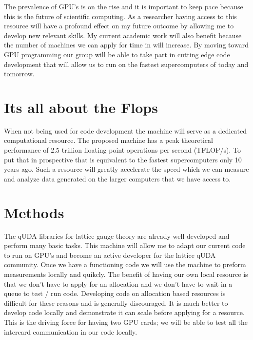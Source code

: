 \documentclass[11pt]{article}
\begin{document}
  The prevalence of GPU's is on the rise and it is important to keep pace because this is the future of scientific computing.
  As a researcher having access to this resource will have a profound effect on my future outcome by allowing me to develop new relevant skills.
  My current academic work will also benefit because the number of machines we can apply for time in will increase.
  By moving toward GPU programming our group will be able to take part in cutting edge code development that will allow us to run on the fastest supercomputers of today and tomorrow.

  \section*{Its all about the Flops} %
  When not being used for code development the machine will serve as a dedicated computational resource.  
  The proposed machine has a peak theoretical performance of 2.5 trillion floating point operations per second (TFLOP/s).
  To put that in prospective that is equivalent to the fastest supercomputers only 10 years ago.
  Such a resource will greatly accelerate the speed which we can measure and analyze data generated on the larger computers that we have access to.

  \section*{Methods} %
  The qUDA libraries for lattice gauge theory are already well developed and perform many basic tasks.
  This machine will allow me to adapt our current code to run on GPU's and become an active developer for the lattice qUDA community.
  Once we have a functioning code we will use the machine to preform measurements locally and quikcly.
  The benefit of having our own local resource is that we don't have to apply for an allocation and we don't have to wait in a queue to test / run code.
  Developing code on allocation based resources is difficult for these reasons and is generally discouraged.
  It is much better to develop code locally and demonstrate it can scale before applying for a resource.
  This is the driving force for having two GPU cards; we will be able to test all the intercard communication in our code locally.
  
\end{document}
